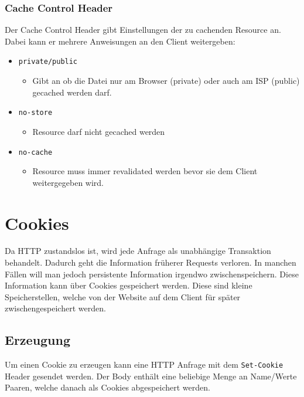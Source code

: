 \documentclass{article}
\begin{document}
\begin{itemize}
	\subsubsection{Cache Control Header}
	Der Cache Control Header gibt Einstellungen der zu cachenden Resource an. Dabei kann er mehrere Anweisungen an den Client weitergeben:
	\begin{itemize}
		\item{\texttt{private/public}}
		\begin{itemize}
			\item{Gibt an ob die Datei nur am Browser (private) oder auch am ISP (public) gecached werden darf.}
		\end{itemize}
		\item{\texttt{no-store}}
		\begin{itemize}
			\item{Resource darf nicht gecached werden}
		\end{itemize}
		\item{\texttt{no-cache}}
		\begin{itemize}
			\item{Resource muss immer revalidated werden bevor sie dem Client weitergegeben wird.}
		\end{itemize}
	\end{itemize}
	\section{Cookies}
	Da HTTP zustandslos ist, wird jede Anfrage als unabhängige Transaktion behandelt. Dadurch geht die Information früherer Requests verloren. In manchen Fällen will man jedoch persistente Information irgendwo zwischenspeichern. Diese Information kann über Cookies gespeichert werden. Diese sind kleine Speicherstellen, welche von der Website auf dem Client für später zwischengespeichert werden.
	\subsection{Erzeugung}
	Um einen Cookie zu erzeugen kann eine HTTP Anfrage mit dem \texttt{Set-Cookie} Header gesendet werden. Der Body enthält eine beliebige Menge an Name/Werte Paaren, welche danach als Cookies abgespeichert werden. 

\end{itemize}
\end{document}
